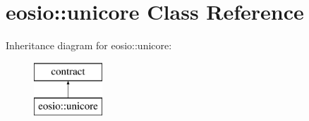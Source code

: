 \hypertarget{classeosio_1_1unicore}{}\section{eosio\+:\+:unicore Class Reference}
\label{classeosio_1_1unicore}
Inheritance diagram for eosio\+:\+:unicore\+:\begin{figure}[H]
\begin{center}
\leavevmode
\includegraphics[height=2.000000cm]{classeosio_1_1unicore}
\end{center}
\end{figure}
